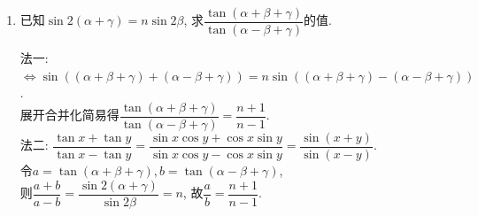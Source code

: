 \begin{enumerate}
\item 已知$\sin2\left(\alpha+\gamma\right)=n\sin2\beta$, 求$\dfrac{\tan\left(\alpha+\beta+\gamma\right)}{\tan\left(\alpha-\beta+\gamma\right)}$的值. 
\begin{jieda}
法一: $\iff\sin\left(\left(\alpha+\beta+\gamma\right)+\left(\alpha-\beta+\gamma\right)\right)=n\sin\left(\left(\alpha+\beta+\gamma\right)-\left(\alpha-\beta+\gamma\right)\right)$. \\
展开合并化简易得$\dfrac{\tan\left(\alpha+\beta+\gamma\right)}{\tan\left(\alpha-\beta+\gamma\right)}=\dfrac{n+1}{n-1}$. \\
法二: $\dfrac{\tan{x}+\tan{y}}{\tan{x}-\tan{y}}=\dfrac{\sin{x}\cos{y}+\cos{x}\sin{y}}{\sin{x}\cos{y}-\cos{x}\sin{y}}=\dfrac{\sin\left(x+y\right)}{\sin\left(x-y\right)}$. \\
令$a=\tan\left(\alpha+\beta+\gamma\right), b=\tan\left(\alpha-\beta+\gamma\right)$, \\
则$\dfrac{a+b}{a-b}=\dfrac{\sin2\left(\alpha+\gamma\right)}{\sin2\beta}=n$, 
故$\dfrac{a}{b}=\dfrac{n+1}{n-1}$. 
\end{jieda}
\end{enumerate}

\clearpage

